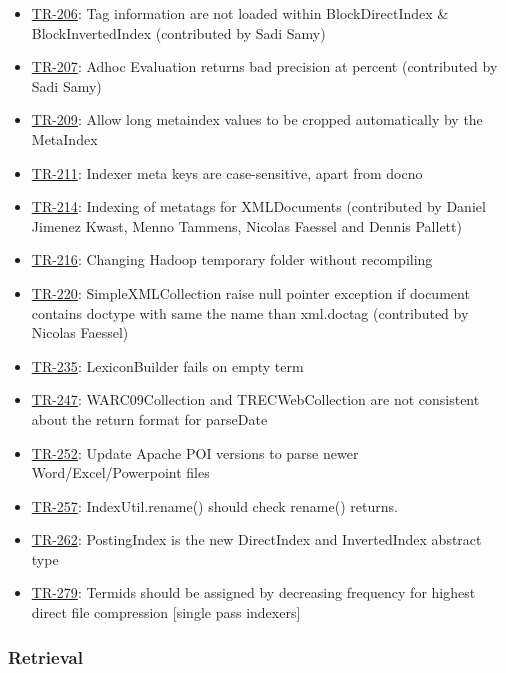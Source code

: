 \begin{itemize}
\item
  \href{http://terrier.org/issues/browse/TR-206}{TR-206}: Tag
  information are not loaded within BlockDirectIndex \&
  BlockInvertedIndex (contributed by Sadi Samy)
\item
  \href{http://terrier.org/issues/browse/TR-207}{TR-207}: Adhoc
  Evaluation returns bad precision at percent (contributed by Sadi Samy)
\item
  \href{http://terrier.org/issues/browse/TR-209}{TR-209}: Allow long
  metaindex values to be cropped automatically by the MetaIndex
\item
  \href{http://terrier.org/issues/browse/TR-211}{TR-211}: Indexer meta
  keys are case-sensitive, apart from docno
\item
  \href{http://terrier.org/issues/browse/TR-214}{TR-214}: Indexing of
  metatags for XMLDocuments (contributed by Daniel Jimenez Kwast, Menno
  Tammens, Nicolas Faessel and Dennis Pallett)
\item
  \href{http://terrier.org/issues/browse/TR-216}{TR-216}: Changing
  Hadoop temporary folder without recompiling
\item
  \href{http://terrier.org/issues/browse/TR-220}{TR-220}:
  SimpleXMLCollection raise null pointer exception if document contains
  doctype with same the name than xml.doctag (contributed by Nicolas
  Faessel)
\item
  \href{http://terrier.org/issues/browse/TR-235}{TR-235}: LexiconBuilder
  fails on empty term
\item
  \href{http://terrier.org/issues/browse/TR-247}{TR-247}:
  WARC09Collection and TRECWebCollection are not consistent about the
  return format for parseDate
\item
  \href{http://terrier.org/issues/browse/TR-252}{TR-252}: Update Apache
  POI versions to parse newer Word/Excel/Powerpoint files
\item
  \href{http://terrier.org/issues/browse/TR-257}{TR-257}:
  IndexUtil.rename() should check rename() returns.
\item
  \href{http://terrier.org/issues/browse/TR-262}{TR-262}: PostingIndex
  is the new DirectIndex and InvertedIndex abstract type
\item
  \href{http://terrier.org/issues/browse/TR-279}{TR-279}: Termids should
  be assigned by decreasing frequency for highest direct file
  compression {[}single pass indexers{]}
\end{itemize}

\subsubsection{Retrieval}\label{retrieval-2}

